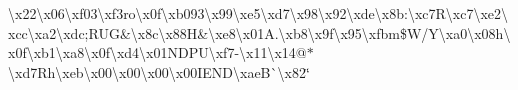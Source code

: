 \begin{DoxyCompactItemize}
\textbackslash{}x22\textbackslash{}x06\textbackslash{}xf03\textbackslash{}xf3ro\textbackslash{}x0f\textbackslash{}xb093\textbackslash{}x99\textbackslash{}xe5\textbackslash{}xd7\textbackslash{}x98\textbackslash{}x92\textbackslash{}xde\textbackslash{}x8b\+:\textbackslash{}xc7\+R\textbackslash{}xc7\textbackslash{}xe2\textbackslash{}xcc\textbackslash{}xa2\textbackslash{}xdc;\+R\+U\+G\&\textbackslash{}x8c\textbackslash{}x88\+H\&\textbackslash{}xe8\textbackslash{}x01\+A.\textbackslash{}xb8\textbackslash{}x9f\textbackslash{}x95\textbackslash{}xfbm\$\+W/\+Y\textbackslash{}xa0\textbackslash{}x08h\textbackslash{}x0f\textbackslash{}xb1\textbackslash{}xa8\textbackslash{}x0f\textbackslash{}xd4\textbackslash{}x01\+N\+D\+P\+U\textbackslash{}xf7-\/\textbackslash{}x11\textbackslash{}x14@$\ast$\textbackslash{}xd7\+Rh\textbackslash{}xeb\textbackslash{}x00\textbackslash{}x00\textbackslash{}x00\textbackslash{}x00\+I\+E\+N\+D\textbackslash{}xae\+B\`{}\textbackslash{}x82\char`\"{}
\item 
$$
\end{DoxyCompactItemize}
